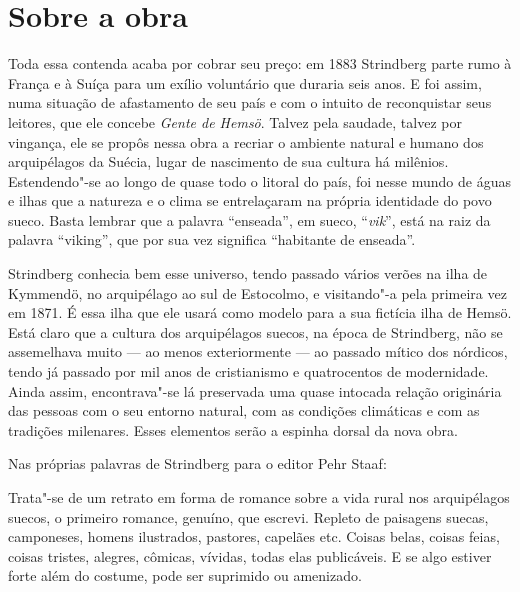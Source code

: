 \section{Sobre a obra}

Toda essa contenda acaba por cobrar seu preço: em 1883 Strindberg parte rumo 
à França e à Suíça para um exílio voluntário que duraria seis anos. E foi assim, numa
situação de afastamento de seu país e com o intuito de reconquistar
seus leitores, que ele concebe \textit{Gente de Hemsö}. Talvez pela saudade,
talvez por vingança, ele se propôs nessa obra a recriar o ambiente natural e
humano dos arquipélagos da Suécia, lugar de nascimento de sua cultura
há milênios. Estendendo"-se ao longo de quase todo o litoral do
país, foi nesse mundo de águas e ilhas que a natureza e o clima se
entrelaçaram na própria identidade do povo sueco. Basta lembrar que a
palavra “enseada”, em sueco, “\textit{vik}”, está na raiz da palavra “viking”,
que por sua vez significa “habitante de enseada”. 

Strindberg conhecia bem esse universo, tendo passado vários verões na
ilha de Kymmendö, no arquipélago ao sul de Estocolmo, e visitando"-a
pela primeira vez em 1871. É essa ilha que ele usará como modelo para a
sua fictícia ilha de Hemsö. Está claro que a cultura dos arquipélagos suecos,
na época de Strindberg, não se assemelhava muito --- ao menos exteriormente ---
ao passado mítico dos nórdicos, tendo já passado por mil anos de cristianismo
e quatrocentos de modernidade.  Ainda assim, encontrava"-se lá
preservada uma quase intocada relação originária das pessoas com o seu
entorno natural, com as condições climáticas e com as tradições milenares. Esses
elementos serão a espinha dorsal da nova obra. 

Nas próprias palavras de Strindberg para o editor Pehr Staaf:

\begin{hedraquote}
Trata"-se de um retrato em forma de romance sobre a vida rural
nos arquipélagos suecos, o primeiro romance, genuíno, que escrevi.
Repleto de paisagens suecas, camponeses, homens ilustrados, pastores,
capelães etc. Coisas belas, coisas feias, coisas tristes, alegres,
cômicas, vívidas, todas elas publicáveis. E se algo estiver forte além
do costume, pode ser suprimido ou amenizado.
\end{hedraquote}

